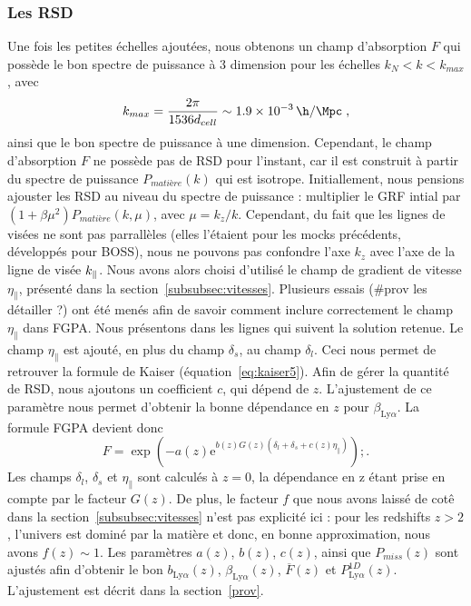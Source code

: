 \documentclass[11pt, twoside, a4paper, openright]{report}
\begin{document}
\subsubsection{Les RSD}
\label{subsubsec:rsdlya}
Une fois les petites échelles ajoutées, nous obtenons un champ d'absorption $F$ qui possède le bon spectre de puissance à 3 dimension pour les échelles $k_N < k < k_{max}$, avec
\begin{equation}
  k_{max} = \frac{2 \pi}{1536 d_{cell}} \sim \SI{1.9e-3}{\h\per\Mpc} \; ,
\end{equation}
ainsi que le bon spectre de puissance à une dimension.
Cependant, le champ d'absorption $F$ ne possède pas de RSD pour l'instant, car il est construit à partir du spectre de puissance $P_{matière}(k)$ qui est isotrope. Initiallement, nous pensions ajouster les RSD au niveau du spectre de puissance : multiplier le GRF intial par $(1 + \beta \mu^2)P_{matière}(k, \mu)$, avec $\mu = k_z / k$. Cependant, du fait que les lignes de visées ne sont pas parrallèles (elles l'étaient pour les mocks précédents, développés pour BOSS), nous ne pouvons pas confondre l'axe $k_z$ avec l'axe de la ligne de visée $k_{\parallel}{}$. Nous avons alors choisi d'utilisé le champ de gradient de vitesse $\eta_{\parallel}$, présenté dans la section~\ref{subsubsec:vitesses}. Plusieurs essais (\#prov les détailler ?)  ont été menés afin de savoir comment inclure correctement le champ $\eta_{\parallel}$ dans FGPA. Nous présentons dans les lignes qui suivent la solution retenue.
Le champ $\eta_{\parallel}$ est ajouté, en plus du champ $\delta_s$, au champ $\delta_l$. Ceci nous permet de retrouver la formule de Kaiser (équation~\ref{eq:kaiser5}). Afin de gérer la quantité de RSD, nous ajoutons un coefficient $c$, qui dépend de $z$. L'ajustement de ce paramètre nous permet d'obtenir la bonne dépendance en $z$ pour $\beta_{\mathrm{Ly}\alpha}$. La formule FGPA devient donc
\begin{equation}
  \label{eq:fgpa4}
  F = \exp( - a(z) \mathrm{e}^{b(z) G(z) (\delta_l + \delta_s + c(z)\eta_{\parallel})}) ;.  
\end{equation}
Les champs $\delta_l$, $\delta_s$ et $\eta_{\parallel}$ sont calculés à $z=0$, la dépendance en z étant prise en compte par le facteur $G(z)$. De plus, le facteur $f$ que nous avons laissé de cotê dans la section~\ref{subsubsec:vitesses} n'est pas explicité ici : pour les redshifts $z > 2$, l'univers est dominé par la matière et donc, en bonne approximation, nous avons $f(z) \sim 1$. Les paramètres $a(z)$, $b(z)$, $c(z)$, ainsi que $P_{miss}(z)$ sont ajustés afin d'obtenir le bon $b_{\mathrm{Ly}\alpha}(z)$, $\beta_{\mathrm{Ly}\alpha}(z)$, $\overline F(z)$ et $P^{1D}_{\mathrm{Ly}\alpha}(z)$. L'ajustement est décrit dans la section~\ref{prov}.
\end{document}
